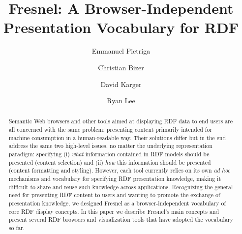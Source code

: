 \documentclass{llncs}
\begin{document}
\frontmatter          %
\pagestyle{headings}  %

\frontmatter          %
%
\pagestyle{headings}  %
\mainmatter              %
%

\title{Fresnel: A Browser-Independent Presentation Vocabulary for RDF }


\author{Emmanuel Pietriga \and Christian Bizer \and David Karger \and Ryan Lee}
%
%
%

\maketitle

\begin{abstract}
Semantic Web browsers and other tools aimed at displaying RDF data to end users are all concerned with the same problem: presenting content primarily intended for machine consumption in a human-readable way. Their solutions differ but in the end address the same two high-level issues, no matter the underlying representation paradigm: specifying (i) {\em what} information contained in RDF models should be presented (content selection) and (ii) {\em how} this information should be presented (content formatting and styling). However, each tool currently relies on its own {\em ad hoc} mechanisms and vocabulary for specifying RDF presentation knowledge, making it difficult to share and reuse such knowledge across applications. Recognizing the general need for presenting RDF content to users and wanting to promote the exchange of presentation knowledge, we designed Fresnel as a browser-independent vocabulary of core RDF display concepts. In this paper we describe Fresnel's main concepts and present several RDF browsers and visualization tools that have adopted the vocabulary so far.
\end{abstract}
\end{document}
